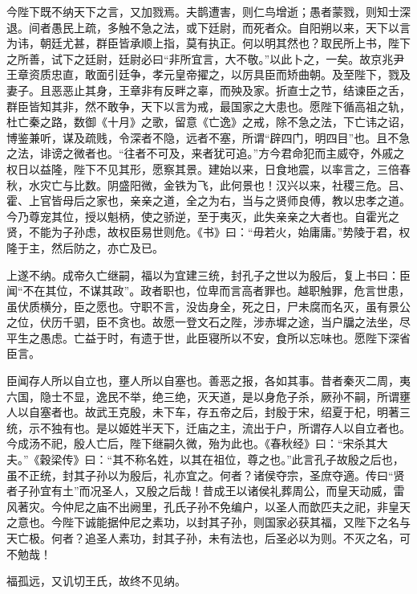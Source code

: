 \documentclass[12pt,UTF8]{ctexbook}
\begin{document}
今陛下既不纳天下之言，又加戮焉。夫鹊遭害，则仁鸟增逝；愚者蒙戮，则知士深退。间者愚民上疏，多触不急之法，或下廷尉，而死者众。自阳朔以来，天下以言为讳，朝廷尤甚，群臣皆承顺上指，莫有执正。何以明其然也？取民所上书，陛下之所善，试下之廷尉，廷尉必曰“非所宜言，大不敬。”以此卜之，一矣。故京兆尹王章资质忠直，敢面引廷争，孝元皇帝擢之，以厉具臣而矫曲朝。及至陛下，戮及妻子。且恶恶止其身，王章非有反畔之辜，而殃及家。折直士之节，结谏臣之舌，群臣皆知其非，然不敢争，天下以言为戒，最国家之大患也。愿陛下循高祖之轨，杜亡秦之路，数御《十月》之歌，留意《亡逸》之戒，除不急之法，下亡讳之诏，博鉴兼听，谋及疏贱，令深者不隐，远者不塞，所谓“辟四门，明四目”也。且不急之法，诽谤之微者也。“往者不可及，来者犹可追。”方今君命犯而主威夺，外戚之权日以益隆，陛下不见其形，愿察其景。建始以来，日食地震，以率言之，三倍春秋，水灾亡与比数。阴盛阳微，金铁为飞，此何景也！汉兴以来，社稷三危。吕、霍、上官皆母后之家也，亲亲之道，全之为右，当与之贤师良傅，教以忠孝之道。今乃尊宠其位，授以魁柄，使之骄逆，至于夷灭，此失亲亲之大者也。自霍光之贤，不能为子孙虑，故权臣易世则危。《书》曰：“毋若火，始庸庸。”势陵于君，权隆于主，然后防之，亦亡及已。



上遂不纳。成帝久亡继嗣，福以为宜建三统，封孔子之世以为殷后，复上书曰：臣闻“不在其位，不谋其政”。政者职也，位卑而言高者罪也。越职触罪，危言世患，虽伏质横分，臣之愿也。守职不言，没齿身全，死之日，尸未腐而名灭，虽有景公之位，伏历千驷，臣不贪也。故愿一登文石之陛，涉赤墀之途，当户牖之法坐，尽平生之愚虑。亡益于时，有遗于世，此臣寝所以不安，食所以忘味也。愿陛下深省臣言。



臣闻存人所以自立也，壅人所以自塞也。善恶之报，各如其事。昔者秦灭二周，夷六国，隐士不显，逸民不举，绝三绝，灭天道，是以身危子杀，厥孙不嗣，所谓壅人以自塞者也。故武王克殷，未下车，存五帝之后，封殷于宋，绍夏于杞，明著三统，示不独有也。是以姬姓半天下，迁庙之主，流出于户，所谓存人以自立者也。今成汤不祀，殷人亡后，陛下继嗣久微，殆为此也。《春秋经》曰：“宋杀其大夫。”《穀梁传》曰：“其不称名姓，以其在祖位，尊之也。”此言孔子故殷之后也，虽不正统，封其子孙以为殷后，礼亦宜之。何者？诸侯夺宗，圣庶夺適。传曰“贤者子孙宜有土”而况圣人，又殷之后哉！昔成王以诸侯礼葬周公，而皇天动威，雷风著灾。今仲尼之庙不出阙里，孔氏子孙不免编户，以圣人而歆匹夫之祀，非皇天之意也。今陛下诚能据仲尼之素功，以封其子孙，则国家必获其福，又陛下之名与天亡极。何者？追圣人素功，封其子孙，未有法也，后圣必以为则。不灭之名，可不勉哉！



福孤远，又讥切王氏，故终不见纳。
\end{document}
